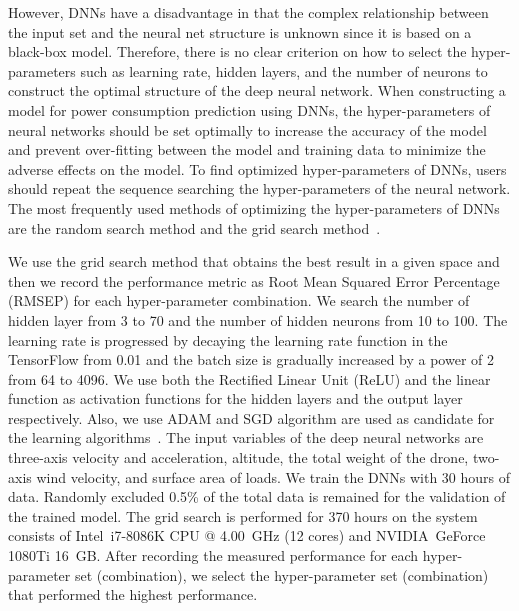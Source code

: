 \documentclass[journal]{./template/IEEEtran}
\begin{document}
However, DNNs have a disadvantage in that the complex relationship between the input set and the neural net structure is unknown since it is based on a black-box model. 
Therefore, there is no clear criterion on how to select the hyper-parameters such as learning rate, hidden layers, and the number of neurons to construct the optimal structure of the deep neural network. 
When constructing a model for power consumption prediction using DNNs, the hyper-parameters of neural networks should be set optimally to increase the accuracy of the model and prevent over-fitting between the model and training data to minimize the adverse effects on the model.
To find optimized hyper-parameters of DNNs, users should repeat the sequence searching the hyper-parameters of the neural network. 
The most frequently used methods of optimizing the hyper-parameters of DNNs are the random search method and the grid search method~\cite{ref_16}. 

We use the grid search method that obtains the best result in a given space and then we record the performance metric as Root Mean Squared Error Percentage (RMSEP) for each hyper-parameter combination.
We search the number of hidden layer from 3 to 70 and the number of hidden neurons from 10 to 100. 
The learning rate is progressed by decaying the learning rate function in the TensorFlow from 0.01 and the batch size is gradually increased by a power of 2 from 64 to 4096.
We use both the Rectified Linear Unit (ReLU) and the linear function as activation functions for the hidden layers and the output layer respectively. 
Also, we use ADAM and SGD algorithm are used as candidate for the learning algorithms~\cite{ref_17}. 
The input variables of the deep neural networks are three-axis velocity and acceleration, altitude, the total weight of the drone, two-axis wind velocity, and surface area of loads. 
We train the DNNs with 30 hours of data. Randomly excluded 0.5\% of the total data is remained for the validation of the trained model.
The grid search is performed for 370 hours on the system consists of Intel\textregistered ~i7-8086K CPU @ 4.00~GHz (12 cores) and NVIDIA\textregistered ~GeForce 1080Ti 16~GB.
After recording the measured performance for each hyper-parameter set (combination), we select the hyper-parameter set (combination) that performed the highest performance.
\end{document}
